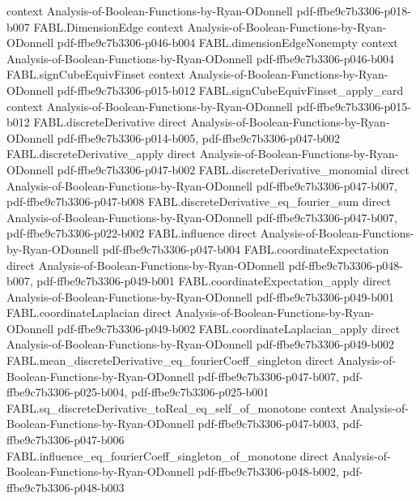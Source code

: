 \begin{theorem}
  {context}
  {Analysis-of-Boolean-Functions-by-Ryan-ODonnell}
  {pdf-ffbe9c7b3306-p018-b007}
\proofstep
  {FABL.DimensionEdge}
  {context}
  {Analysis-of-Boolean-Functions-by-Ryan-ODonnell}
  {pdf-ffbe9c7b3306-p046-b004}
\proofstep
  {FABL.dimensionEdgeNonempty}
  {context}
  {Analysis-of-Boolean-Functions-by-Ryan-ODonnell}
  {pdf-ffbe9c7b3306-p046-b004}
\proofstep
  {FABL.signCubeEquivFinset}
  {context}
  {Analysis-of-Boolean-Functions-by-Ryan-ODonnell}
  {pdf-ffbe9c7b3306-p015-b012}
\proofstep
  {FABL.signCubeEquivFinset_apply_card}
  {context}
  {Analysis-of-Boolean-Functions-by-Ryan-ODonnell}
  {pdf-ffbe9c7b3306-p015-b012}
\proofstep
  {FABL.discreteDerivative}
  {direct}
  {Analysis-of-Boolean-Functions-by-Ryan-ODonnell}
  {pdf-ffbe9c7b3306-p014-b005,
    pdf-ffbe9c7b3306-p047-b002}
\proofstep
  {FABL.discreteDerivative_apply}
  {direct}
  {Analysis-of-Boolean-Functions-by-Ryan-ODonnell}
  {pdf-ffbe9c7b3306-p047-b002}
\proofstep
  {FABL.discreteDerivative_monomial}
  {direct}
  {Analysis-of-Boolean-Functions-by-Ryan-ODonnell}
  {pdf-ffbe9c7b3306-p047-b007,
    pdf-ffbe9c7b3306-p047-b008}
\proofstep
  {FABL.discreteDerivative_eq_fourier_sum}
  {direct}
  {Analysis-of-Boolean-Functions-by-Ryan-ODonnell}
  {pdf-ffbe9c7b3306-p047-b007,
    pdf-ffbe9c7b3306-p022-b002}
\proofstep
  {FABL.influence}
  {direct}
  {Analysis-of-Boolean-Functions-by-Ryan-ODonnell}
  {pdf-ffbe9c7b3306-p047-b004}
\proofstep
  {FABL.coordinateExpectation}
  {direct}
  {Analysis-of-Boolean-Functions-by-Ryan-ODonnell}
  {pdf-ffbe9c7b3306-p048-b007,
    pdf-ffbe9c7b3306-p049-b001}
\proofstep
  {FABL.coordinateExpectation_apply}
  {direct}
  {Analysis-of-Boolean-Functions-by-Ryan-ODonnell}
  {pdf-ffbe9c7b3306-p049-b001}
\proofstep
  {FABL.coordinateLaplacian}
  {direct}
  {Analysis-of-Boolean-Functions-by-Ryan-ODonnell}
  {pdf-ffbe9c7b3306-p049-b002}
\proofstep
  {FABL.coordinateLaplacian_apply}
  {direct}
  {Analysis-of-Boolean-Functions-by-Ryan-ODonnell}
  {pdf-ffbe9c7b3306-p049-b002}
\proofstep
  {FABL.mean_discreteDerivative_eq_fourierCoeff_singleton}
  {direct}
  {Analysis-of-Boolean-Functions-by-Ryan-ODonnell}
  {pdf-ffbe9c7b3306-p047-b007,
    pdf-ffbe9c7b3306-p025-b004,
    pdf-ffbe9c7b3306-p025-b001}
\proofstep
  {FABL.sq_discreteDerivative_toReal_eq_self_of_monotone}
  {context}
  {Analysis-of-Boolean-Functions-by-Ryan-ODonnell}
  {pdf-ffbe9c7b3306-p047-b003,
    pdf-ffbe9c7b3306-p047-b006}
\proofstep
  {FABL.influence_eq_fourierCoeff_singleton_of_monotone}
  {direct}
  {Analysis-of-Boolean-Functions-by-Ryan-ODonnell}
  {pdf-ffbe9c7b3306-p048-b002,
    pdf-ffbe9c7b3306-p048-b003}

\end{theorem}
